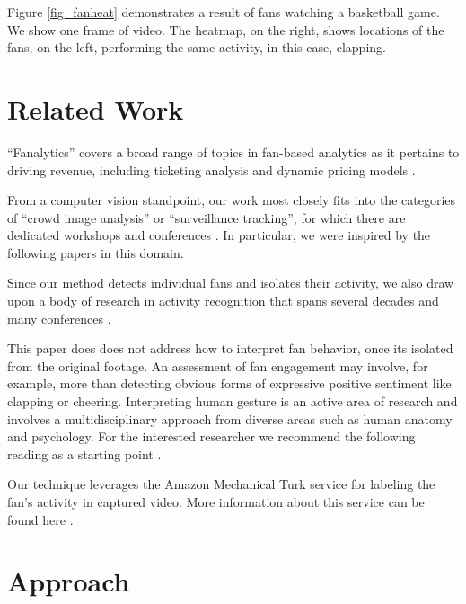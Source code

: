 \documentclass[times, 10pt,twocolumn]{article}
\begin{document}
Figure \ref{fig_fanheat} demonstrates a result of fans watching a basketball game. We show one frame of video.  The heatmap, on the right, shows locations of the fans, on the left, performing the same activity, in this case, clapping. 

\section{Related Work}
\label{sec_related}

``Fanalytics'' covers a broad range of topics in fan-based analytics as it pertains to driving revenue, including ticketing analysis and dynamic pricing models \cite{fanalytics} \cite{ticketmaster} \cite{ticketmaster2} \cite{ticketinganalytics} \cite{ticketinganalytics2}.

From a computer vision standpoint, our work most closely fits into the categories of ``crowd image analysis'' or ``surveillance tracking'', for which there are dedicated workshops and conferences \cite{pets} \cite{msvalc}.  In particular, we were inspired by the following papers \cite{trackingunstructured} \cite{trackingsmallgroups} in this domain.

Since our method detects individual fans and isolates their activity, we also draw upon a body of research in activity recognition that spans several decades and many conferences \cite{modelbasedimage} \cite{modelbasedvision} \cite{humanmotionanalysis} \cite{threedeemodel} \cite{modelrec} \cite{modelbasedtracking} \cite{trackingpeople} \cite{modelbasedest} \cite{articbody} \cite{stochastic}.

This paper does does not address how to interpret fan behavior, once its isolated from the original footage.  An assessment of fan engagement may involve, for example, more than detecting obvious forms of expressive positive sentiment like clapping or cheering.  Interpreting human gesture is an active area of research and involves a multidisciplinary approach from diverse areas such as human anatomy and psychology.  For the interested researcher we recommend the following reading as a starting point \cite{laban}.

Our technique leverages the Amazon Mechanical Turk service for labeling the fan's activity in captured video.  More information about this service can be found here \cite{amazon}.  

\section{Approach}
\end{document}
